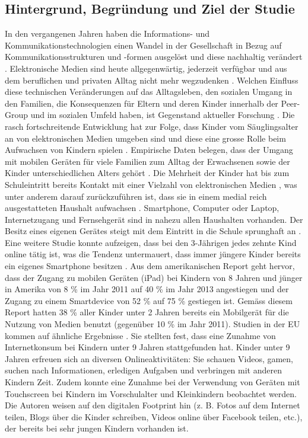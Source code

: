 \subsection{Hintergrund, Begründung und Ziel der Studie}\label{sec:Hintergrund}
In den vergangenen Jahren haben die Informations- und Kommunikationstechnologien einen Wandel in der Gesellschaft in Bezug auf Kommunikationsstrukturen und -formen ausgelöst und diese nachhaltig verändert \cite{Hasebrink2009, Bms2013}. Elektronische Medien sind heute allgegenwärtig, jederzeit verfügbar und aus dem beruflichen und privaten Alltag nicht mehr wegzudenken \cite{Bmfsfj2013}. Welchen Einfluss diese technischen Veränderungen auf das Alltagsleben, den sozialen Umgang in den Familien, die Konsequenzen für Eltern und deren Kinder innerhalb der Peer-Group und im sozialen Umfeld haben, ist Gegenstand aktueller Forschung \cite{Olafsson2014}. Die rasch fortschreitende Entwicklung hat zur Folge, dass Kinder vom Säuglingsalter an von elektronischen Medien umgeben sind und diese eine grosse Rolle beim Aufwachsen von Kindern spielen \cite{Feierabend2015, Divsi2015}. Empirische Daten belegen, dass der Umgang mit mobilen Geräten für viele Familien zum Alltag der Erwachsenen sowie der Kinder unterschiedlichen Alters gehört \cite{Wagner2016}. Die Mehrheit der Kinder hat bis zum Schuleintritt bereits Kontakt mit einer Vielzahl von elektronischen Medien \cite{Feierabend2015}, was unter anderem darauf zurückzuführen ist, dass sie in einem medial reich ausgestatteten Haushalt aufwachsen \cite{Suter2015}. Smartphone, Computer oder Laptop, Internetzugang und Fernsehgerät sind in nahezu allen Haushalten vorhanden. Der Besitz eines eigenen Gerätes steigt mit dem Eintritt in die Schule sprunghaft an \cite{Feierabend2015a}. Eine weitere Studie konnte aufzeigen, dass bei den 3-Jährigen jedes zehnte Kind online tätig ist, was die Tendenz untermauert, dass immer jüngere Kinder bereits ein eigenes Smartphone besitzen \cite{Divsi2015}. Aus dem amerikanischen Report  geht hervor, dass der Zugang zu mobilen Geräten (iPad) bei Kindern von 8 Jahren und jünger in Amerika von 8 \% im Jahr 2011 auf 40 \% im Jahr 2013 angestiegen und der Zugang zu einem Smartdevice von 52 \% auf 75 \% gestiegen ist. Gemäss diesem Report hatten 38 \% aller Kinder unter 2 Jahren bereits ein Mobilgerät für die Nutzung von Medien benutzt (gegenüber 10 \% im Jahr 2011). Studien in der EU kommen auf ähnliche Ergebnisse \cite{Holloway2013}. Sie stellten fest, dass eine Zunahme von Internetkonsum bei Kindern unter 9 Jahren stattgefunden hat. Kinder unter 9 Jahren erfreuen sich an diversen Onlineaktivitäten: Sie schauen Videos, gamen, suchen nach Informationen, erledigen Aufgaben
und verbringen mit anderen Kindern Zeit. Zudem konnte eine Zunahme bei der Verwendung von Geräten mit Touchscreen bei Kindern im Vorschulalter und Kleinkindern beobachtet werden. Die Autoren weisen auf den digitalen Footprint hin (z. B. Fotos auf dem Internet teilen, Blogs über die Kinder schreiben, Videos online über Facebook teilen, etc.), der bereits bei sehr jungen Kindern vorhanden ist.

